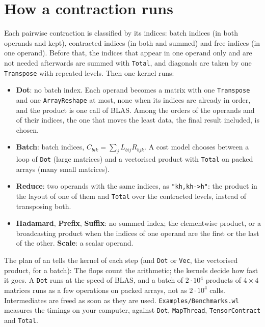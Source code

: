 \documentclass[11pt,a4paper]{article}
\begin{document}
\section{How a contraction runs}
Each pairwise contraction is classified by its indices: batch indices (in both operands and kept), contracted indices (in
both and summed) and free indices (in one operand). Before that, the indices that appear in one operand only and are not
needed afterwards are summed with \texttt{Total}, and diagonals are taken by one \texttt{Transpose} with repeated levels.
Then one kernel runs:
\begin{itemize}
\item \textbf{Dot}: no batch index. Each operand becomes a matrix with one \texttt{Transpose} and one \texttt{ArrayReshape}
  at most, none when its indices are already in order, and the product is one call of BLAS. Among the orders of the
  operands and of their indices, the one that moves the least data, the final result included, is chosen.
\item \textbf{Batch}: batch indices, $C_{bik}=\sum_jL_{bij}R_{bjk}$. A cost model chooses between a loop of \texttt{Dot}
  (large matrices) and a vectorised product with \texttt{Total} on packed arrays (many small matrices).
\item \textbf{Reduce}: two operands with the same indices, as \texttt{"kh,kh->h"}: the product in the layout of one of them
  and \texttt{Total} over the contracted levels, instead of transposing both.
\item \textbf{Hadamard}, \textbf{Prefix}, \textbf{Suffix}: no summed index; the elementwise product, or a broadcasting
  product when the indices of one operand are the first or the last of the other. \textbf{Scale}: a scalar operand.
\end{itemize}
The plan of an  tells the kernel of each step (and \texttt{Dot} or \texttt{Vec}, the vectorised product,
for a batch):
The flops count the arithmetic; the kernels decide how fast it goes. A \texttt{Dot} runs at the speed of BLAS, and a batch of
$2\cdot10^4$ products of $4\times4$ matrices runs as a few operations on packed arrays, not as $2\cdot10^4$ calls.
Intermediates are freed as soon as they are used. \texttt{Examples/Benchmarks.wl} measures the timings on your computer,
against \texttt{Dot}, \texttt{MapThread}, \texttt{TensorContract} and \texttt{Total}.

\end{document}
